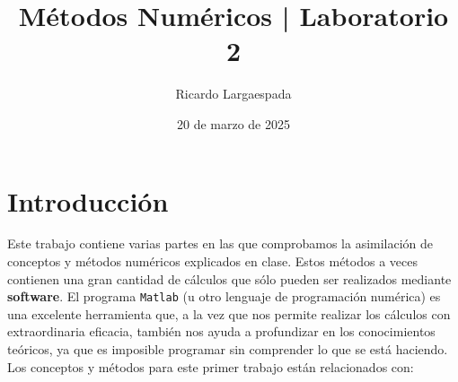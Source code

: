 \documentclass[12pt]{article}
\author{Ricardo Largaespada}
\title{\textbf{Métodos Numéricos | Laboratorio 2}}
\date{20 de marzo de 2025}
\begin{document}
\maketitle


\section*{Introducción}

Este trabajo contiene varias partes en las que comprobamos la asimilación de conceptos y métodos numéricos explicados en clase. Estos métodos a veces contienen una gran cantidad de cálculos que sólo pueden ser realizados mediante \textbf{software}. El programa \texttt{Matlab} (u otro lenguaje de programación numérica) es una excelente herramienta que, a la vez que nos permite realizar los cálculos con extraordinaria eficacia, también nos ayuda a profundizar en los conocimientos teóricos, ya que es imposible programar sin comprender lo que se está haciendo. Los conceptos y métodos para este primer trabajo están relacionados con:
\end{document}
